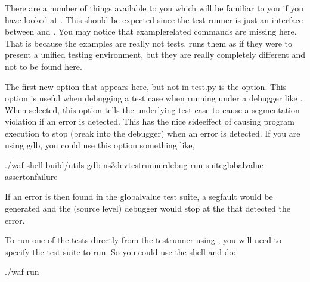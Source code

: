 \documentclass[letterpaper,10pt,english]{sphinxmanual}
\renewcommand{\sphinxcode}[1]{\texttt{\small{#1}}}
\begin{document}
There are a number of things available to you which will be familiar to you if
you have looked at \sphinxcode{}.  This should be expected since the test\sphinxhyphen{}
runner is just an interface between \sphinxcode{} and .  You
may notice that example\sphinxhyphen{}related commands are missing here.  That is because
the examples are really not  tests.  \sphinxcode{} runs them
as if they were to present a unified testing environment, but they are really
completely different and not to be found here.

The first new option that appears here, but not in test.py is the \sphinxcode{\sphinxupquote{\sphinxhyphen{}\sphinxhyphen{}assert\sphinxhyphen{}on\sphinxhyphen{}failure}}
option.  This option is useful when debugging a test case when running under a
debugger like \sphinxcode{}.  When selected, this option tells the underlying
test case to cause a segmentation violation if an error is detected.  This has
the nice side\sphinxhyphen{}effect of causing program execution to stop (break into the
debugger) when an error is detected.  If you are using gdb, you could use this
option something like,

\begin{sphinxVerbatim}[commandchars=\\\{\}]
\PYGZdl{} ./waf shell
\PYGZdl{}  build/utils
\PYGZdl{} gdb ns3\PYGZhy{}dev\PYGZhy{}test\PYGZhy{}runner\PYGZhy{}debug
\PYGZdl{} run \PYGZhy{}\PYGZhy{}suiteglobal\PYGZhy{}value \PYGZhy{}\PYGZhy{}assert\PYGZhy{}on\PYGZhy{}failure
\end{sphinxVerbatim}

If an error is then found in the global\sphinxhyphen{}value test suite, a segfault would be
generated and the (source level) debugger would stop at the \sphinxcode{}
that detected the error.

To run one of the tests directly from the test\sphinxhyphen{}runner
using \sphinxcode{}, you will need to specify the test suite to run.
So you could use the shell and do:

\begin{sphinxVerbatim}[commandchars=\\\{\}]
\PYGZdl{} ./waf \PYGZhy{}\PYGZhy{}run 
\end{sphinxVerbatim}
\end{document}
